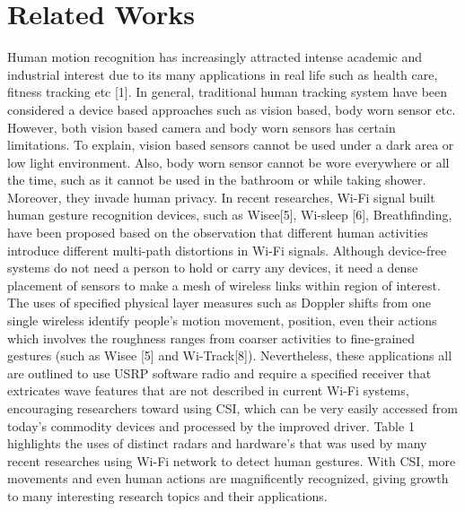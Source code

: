 \documentclass[conference]{IEEEtran}
\begin{document}
\section{Related Works}
Human motion recognition has increasingly attracted intense academic and industrial interest due to its many applications in real life such as health care, fitness tracking etc [1]. In general, traditional human tracking system have been considered a device based approaches such as vision based, body worn sensor etc. However, both vision based camera and body worn sensors has certain limitations. To explain, vision based sensors cannot be used under a dark area or low light environment. Also, body worn sensor cannot be wore everywhere or all the time, such as it cannot be used in the bathroom or while taking shower. Moreover, they invade human privacy. In recent researches, Wi-Fi signal built human gesture recognition devices, such as Wisee[5], Wi-sleep [6], Breathfinding, have been proposed based on the observation that different human activities introduce different multi-path distortions in Wi-Fi signals. 
\newline
Although device-free systems do not need a person to hold or carry any devices, it need a dense placement of sensors to make a mesh of wireless links within region of interest. The uses of specified physical layer measures such as Doppler shifts from one single wireless identify people’s motion movement, position, even their actions which involves the roughness ranges from coarser activities to fine-grained gestures (such as Wisee [5] and Wi-Track[8]). Nevertheless, these applications all are outlined to use USRP software radio and require a specified receiver that extricates wave features that are not described in current Wi-Fi systems, encouraging researchers toward using CSI, which can be very easily accessed from today’s commodity devices and processed by the improved driver. Table 1 highlights the uses of distinct radars and hardware’s that was used by many recent researches using Wi-Fi network to detect human gestures. With CSI, more movements and even human actions are magnificently recognized, giving growth to many interesting research topics and their applications. \newline
\end{document}
